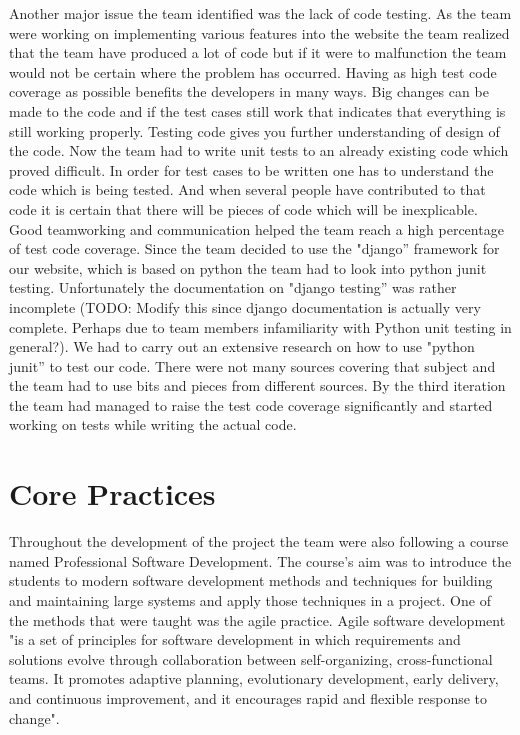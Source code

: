 \documentclass{l3proj}
\begin{document}
Another major issue the team identified was the lack of code testing. As the team were working on implementing various features into the website
the team realized that the team have produced a lot of code but if it were to malfunction the team would not be certain where the problem has occurred.
Having as high test code coverage as possible benefits the developers in many ways. Big changes can be made to the code and if
the test cases still work that indicates that everything is still working properly. Testing code gives you further understanding of
design of the code. Now the team had to write unit tests to an already existing code which proved difficult. In order for test cases to
be written one has to understand the code which is being tested. And when several people have contributed to that code it is certain
that there will be pieces of code which will be inexplicable. Good teamworking and communication helped the team reach a high percentage
of test code coverage. Since the team decided to use the "django'' framework for our website, which is based on python the team had to look into
python junit testing. Unfortunately the documentation on "django testing'' was rather incomplete (TODO: Modify this since django documentation
is actually very complete. Perhaps due to team members infamiliarity with Python unit testing in general?). We had to carry out an extensive research
on how to use "python junit'' to test our code. There were not many sources covering that subject and the team had to use bits and pieces from
different sources. By the third iteration the team had managed to raise the test code coverage significantly and started working on tests
while writing the actual code.

\section{Core Practices}
\label {sec:core-practices}

Throughout the development of the project the team were also following a course named Professional Software Development.
The course's aim was to introduce the students to modern software development methods and techniques for building and
maintaining large systems and apply those techniques in a project. One of the methods that were taught
was the agile practice. Agile software development "is a set of principles for software development in
which requirements and solutions evolve through collaboration between self-organizing, cross-functional teams.
It promotes adaptive planning, evolutionary development, early delivery, and continuous improvement, and it encourages
rapid and flexible response to change".
\end{document}
